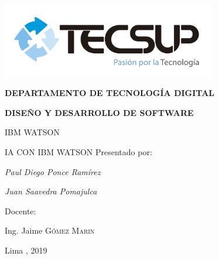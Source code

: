 \begin{titlepage}
	\centering
	\includegraphics[width=0.70\textwidth]{img/logo_tecsup_final}\par\vspace{1cm}
	\vspace{0.30cm}	
	{\scshape\large\bfseries DEPARTAMENTO DE TECNOLOG\'IA DIGITAL \par}
	\vspace{0.60cm}	
	{\scshape\large\bfseries DISEÑO Y DESARROLLO DE SOFTWARE  \par}
	\vspace{2.00cm}		
	{\large\large IBM WATSON \par}
	\vspace{0.60cm}
	{\scshape\large IA CON IBM WATSON }
	\vspace{0.60cm}
	\vfill
	Presentado por: \par
	{\large\itshape { Paul Diego Ponce Ramírez }\par}
	{\large\itshape { Juan Saavedra Pomajulca }\par}
	\vspace{0.30cm}
	\vfill
	Docente: \par
	Ing. Jaime  \textsc{ Gómez Marin}
	
  \vspace{0.30cm}
	\vfill
        {\large Lima , 2019 \par}
\end{titlepage}

